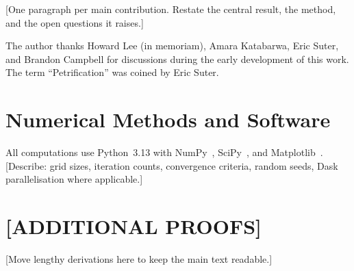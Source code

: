 \documentclass[aps,pre,twocolumn,superscriptaddress,nofootinbib,longbibliography]{revtex4-2}
\theoremstyle{plain}
\theoremstyle{definition}
\theoremstyle{remark}
\begin{document}
[One paragraph per main contribution.  Restate the central
result, the method, and the open questions it raises.]

\begin{acknowledgments}
The author thanks Howard Lee (in memoriam), Amara Katabarwa,
Eric Suter, and Brandon Campbell for discussions during the
early development of this work.  The term ``Petrification'' was
coined by Eric Suter.
\end{acknowledgments}


\appendix

\section{Numerical Methods and Software}
\label{app:numerics}

All computations use Python~3.13 with NumPy~\cite{Numpy2020},
SciPy~\cite{Scipy2020}, and Matplotlib~\cite{Matplotlib2007}.
[Describe: grid sizes, iteration counts, convergence criteria,
random seeds, Dask parallelisation where applicable.]

\section{[ADDITIONAL PROOFS]}
\label{app:proofs}

[Move lengthy derivations here to keep the main text readable.]


\end{document}
